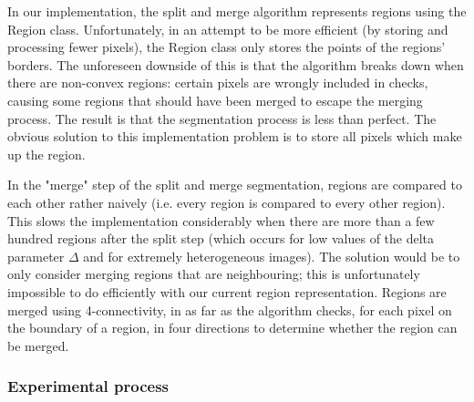 In our implementation, the split and merge algorithm represents regions using the Region class. Unfortunately, in an attempt to be more efficient (by storing and processing fewer pixels), the Region class only stores the points of the regions' borders. The unforeseen downside of this is that the algorithm breaks down when there are non-convex regions: certain pixels are wrongly included in checks, causing some regions that should have been merged to escape the merging process. The result is that the segmentation process is less than perfect. The obvious solution to this implementation problem is to store all pixels which make up the region.

In the "merge" step of the split and merge segmentation, regions are compared to each other rather naively (i.e. every region is compared to every other region). This slows the implementation considerably when there are more than a few hundred regions after the split step (which occurs for low values of the delta parameter $\Delta$ and for extremely heterogeneous images). The solution would be to only consider merging regions that are neighbouring; this is unfortunately impossible to do efficiently with our current region representation. Regions are merged using 4-connectivity, in as far as the algorithm checks, for each pixel on the boundary of a region, in four directions to determine whether the region can be merged.

\subsubsection{Experimental process}

